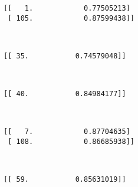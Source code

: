 \documentclass{article}
\begin{document}
    \begin{Verbatim}[commandchars=\\\{\}]
[[   1.            0.77505213]
 [ 105.            0.87599438]]
    \end{Verbatim}

    \begin{center}
    \end{center}
    { \hspace*{\fill} \\}
    
    \begin{Verbatim}[commandchars=\\\{\}]
[[ 35.           0.74579048]]
    \end{Verbatim}

    \begin{center}
    \end{center}
    { \hspace*{\fill} \\}
    
    \begin{Verbatim}[commandchars=\\\{\}]
[[ 40.           0.84984177]]
    \end{Verbatim}

    \begin{center}
    \end{center}
    { \hspace*{\fill} \\}
    
    \begin{Verbatim}[commandchars=\\\{\}]
[[   7.            0.87704635]
 [ 108.            0.86685938]]
    \end{Verbatim}

    \begin{center}
    \end{center}
    { \hspace*{\fill} \\}
    
    \begin{Verbatim}[commandchars=\\\{\}]
[[ 59.           0.85631019]]
    \end{Verbatim}
\end{document}
